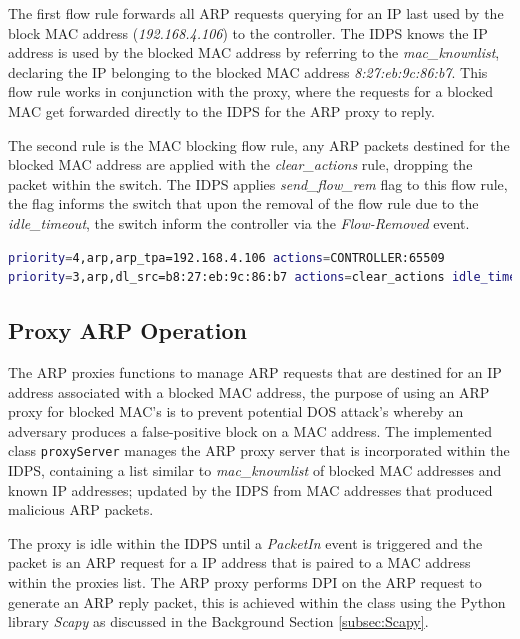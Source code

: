 \documentclass[12pt, oneside]{book}
\begin{document}
The first flow rule forwards all ARP requests querying for an IP last used by the block MAC address
(\emph{192.168.4.106}) to the controller. The IDPS knows the IP address is used by the blocked MAC address by referring to the \emph{mac\_knownlist},
declaring the IP belonging to the blocked MAC address \emph{8:27:eb:9c:86:b7}.
This flow rule works in conjunction with the proxy, where the requests for a blocked MAC get forwarded
directly to the IDPS for the ARP proxy to reply.

The second rule is the MAC blocking flow rule, any ARP packets destined for the 
blocked MAC address are applied with the \emph{clear\_actions} rule, dropping the packet within the switch.
The IDPS applies \emph{send\_flow\_rem} flag to this flow rule,
the flag informs the switch that upon the removal of the flow rule due to the \emph{idle\_timeout}, the switch
 inform the controller via the \emph{Flow-Removed} event.

\begin{lstlisting}[language=Bash,caption={Blocking MAC's ARP packets Flow Rules},captionpos=b,label={lst:blockedflowrules}]
priority=4,arp,arp_tpa=192.168.4.106 actions=CONTROLLER:65509
priority=3,arp,dl_src=b8:27:eb:9c:86:b7 actions=clear_actions idle_timeout=300, send_flow_rem
\end{lstlisting}


\subsection{Proxy ARP Operation}
\label{subsec:proxyARP}
The ARP proxies functions to manage ARP requests that are destined for an IP address associated with a
blocked MAC address, the purpose of using an ARP proxy for blocked MAC's is to prevent potential DOS attack's whereby an adversary
produces a false-positive block on a MAC address.
The implemented class \lstinline{proxyServer} manages the ARP proxy server that is incorporated within the IDPS,
containing a list similar to \emph{mac\_knownlist} of blocked MAC addresses and known IP addresses; updated
by the IDPS from MAC addresses that produced malicious ARP packets.

The proxy is idle within the IDPS until a \emph{PacketIn} event is triggered and the packet is an ARP request for a
IP address that is paired to a MAC address within the proxies list. The ARP proxy performs DPI on 
the ARP request to generate an ARP reply packet, this is achieved within the class
using the Python library \emph{Scapy} as discussed in the Background Section \ref{subsec:Scapy}.
\end{document}
